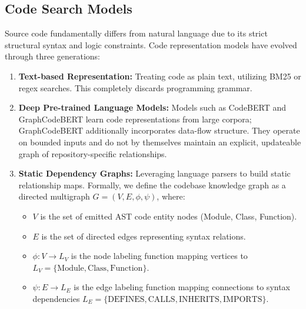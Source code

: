 \documentclass[12pt,letterpaper,oneside]{report}
\begin{document}
\subsection{Code Search Models}
Source code fundamentally differs from natural language due to its strict structural syntax and logic constraints. Code representation models have evolved through three generations:
\begin{enumerate}
    \item \textbf{Text-based Representation:} Treating code as plain text, utilizing BM25 or regex searches. This completely discards programming grammar.
    \item \textbf{Deep Pre-trained Language Models:} Models such as CodeBERT \cite{feng2020codebert} and GraphCodeBERT \cite{guo2024graphcodebert} learn code representations from large corpora; GraphCodeBERT additionally incorporates data-flow structure. They operate on bounded inputs and do not by themselves maintain an explicit, updateable graph of repository-specific relationships.
    \item \textbf{Static Dependency Graphs:} Leveraging language parsers to build static relationship maps. Formally, we define the codebase knowledge graph as a directed multigraph $G = (V, E, \phi, \psi)$, where:
    \begin{itemize}
        \item $V$ is the set of emitted AST code entity nodes (Module, Class, Function).
        \item $E$ is the set of directed edges representing syntax relations.
        \item $\phi: V \rightarrow L_V$ is the node labeling function mapping vertices to $L_V = \{\text{Module}, \allowbreak \text{Class}, \allowbreak \text{Function}\}$.
        \item $\psi: E \rightarrow L_E$ is the edge labeling function mapping connections to syntax dependencies $L_E = \{\text{DEFINES}, \allowbreak \text{CALLS}, \allowbreak \text{INHERITS}, \allowbreak \text{IMPORTS}\}$.
    \end{itemize}
\end{enumerate}
\end{document}
